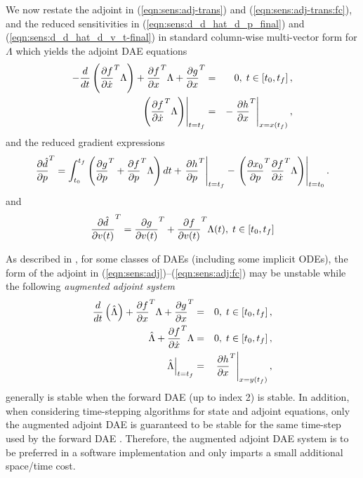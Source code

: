 \documentclass[pdf,ps2pdf,11pt]{SANDreport}
\begin{document}
We now restate the adjoint in (\ref{eqn:sens:adj-trans}) and
(\ref{eqn:sens:adj-trans:fc}), and the reduced sensitivities in
(\ref{eqn:sens:d_d_hat_d_p_final}) and (\ref{eqn:sens:d_d_hat_d_v_t-final}) in
standard column-wise multi-vector form for $\Lambda$ which yields the adjoint
DAE equations
%
\begin{eqnarray}
- \frac{d}{dt}\left( \displaystyle{\frac{\partial f}{\partial \dot{x}}}^T \Lambda \right)
+  \displaystyle{\frac{\partial f}{\partial x}}^T \Lambda + \displaystyle{\frac{\partial g}{\partial x}}^T
& = & 0, \; t \in \left[ t_0, t_f \right],
\label{eqn:sens:adj} \\
\left.\left( \displaystyle{\frac{\partial f}{\partial \dot{x}}}^T \Lambda \right)\right|_{t=t_f}
& = & - \left. \displaystyle{\frac{\partial h}{\partial x}}^T \right|_{x=x(t_f)},
\label{eqn:sens:adj:fc}
\end{eqnarray}
%
and the reduced gradient expressions
%
\begin{equation}
\displaystyle{\frac{\partial \hat{d}}{\partial p}}^T =
\int_{t_0}^{t_f} \left(
    \displaystyle{\frac{\partial g}{\partial p}}^T
    + \displaystyle{\frac{\partial f}{\partial p}}^T \Lambda
  \right) dt
  + \left. \displaystyle{\frac{\partial h}{\partial p}}^T \right|_{t=t_f}
  - \left. \left( \displaystyle{\frac{\partial x_0}{\partial p}}^T \displaystyle{\frac{\partial f}{\partial \dot{x}}}^T \Lambda \right) \right|_{t=t_0}.
\label{eqn:sens:d_d_hat_d_p_final-2}
\end{equation}
%
and
%
\begin{equation}
\displaystyle{\frac{\partial \hat{d}}{\partial v(t)}}^T =  \displaystyle{\frac{\partial g}{\partial v(t)}}^T + \displaystyle{\frac{\partial f}{\partial v(t)}}^T \Lambda(t), \; t\in[t_0,t_f]
\label{eqn:sens:d_d_hat_d_v_t-final-2}
\end{equation}
%

As described in {}\cite{adjoint-sens-2003}, for some classes of DAEs
(including some implicit ODEs), the form of the adjoint in
(\ref{eqn:sens:adj})--(\ref{eqn:sens:adj:fc}) may be unstable while the
following {}\textit{augmented adjoint system}
%
\begin{eqnarray}
\frac{d}{dt}\left( \hat{\Lambda} \right)
+  \displaystyle{\frac{\partial f}{\partial x}}^T \Lambda + \displaystyle{\frac{\partial g}{\partial x}}^T
& = & 0, \; t \in \left[ t_0, t_f \right],
\label{eqn:sens:aug-adj-de} \\
\hat{\Lambda} + \displaystyle{\frac{\partial f}{\partial \dot{x}}}^T \Lambda
& = & 0, \; t \in \left[ t_0, t_f \right],
\label{eqn:sens:aug-adj-ae} \\
\left. \hat{\Lambda} \right|_{t=t_f}
& = & \left. \displaystyle{\frac{\partial h}{\partial x}}^T \right|_{x=y(t_f)},
\label{eqn:sens:aug-adj:fc}
\end{eqnarray}
%
generally is stable when the forward DAE (up to index 2) is stable.  In
addition, when considering time-stepping algorithms for state and adjoint
equations, only the augmented adjoint DAE is guaranteed to be stable for the
same time-step used by the forward DAE {}\cite{adjoint-sens-2003}.  Therefore,
the augmented adjoint DAE system is to be preferred in a software
implementation and only imparts a small additional space/time cost.
\end{document}
